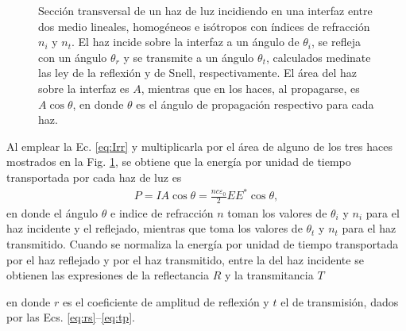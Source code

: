 \begin{figure}[h]
	\caption{Sección transversal de un haz de luz incidiendo en una interfaz entre dos medio lineales, homogéneos e isótropos con índices de refracción $n_i$ y $n_t$. El haz incide sobre la interfaz a un ángulo de $\theta_i$, se refleja con un ángulo $\theta_r$ y se transmite a un ángulo $\theta_t$, calculados medinate las ley de la reflexión y de Snell, respectivamente. El área del haz sobre la interfaz es $A$, mientras que en los haces, al propagarse, es $A\cos\theta$, en donde $\theta$ es el ángulo de propagación respectivo para cada haz.} \label{fig:hazcircular}
	\end{figure}

 Al emplear la Ec. \eqref{eq:Irr} y multiplicarla por el área de alguno de los tres haces mostrados en la Fig. \ref{fig:hazcircular}, se obtiene que la energía por unidad de tiempo transportada por cada haz de luz es
	\begin{align*}
	P = I A \cos\theta = \frac{n c \varepsilon_0}{2}  EE^* \cos\theta,
	\end{align*}
en donde el ángulo $\theta$ e indice de refracción $n$ toman los valores de $\theta_i$ y $n_i$ para el haz incidente y el reflejado, mientras que  toma los valores de $\theta_t$ y  $n_t$ para el haz transmitido. Cuando se normaliza la energía por unidad de tiempo transportada por el haz reflejado y por el haz transmitido, entre la del haz incidente se obtienen las expresiones de la reflectancia $R$ y la transmitancia $T$ \vspace{-.5em} 
	\begin{tcolorbox}[title = Reflectancia y transmitancia]
	\end{tcolorbox}\vspace*{-.75em}\noindent	
en donde $r$ es el coeficiente de amplitud de reflexión y $t$ el de transmisión, dados por las Ecs. \eqref{eq:rs}--\eqref{eq:tp}.

